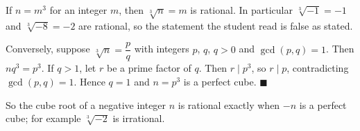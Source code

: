 If $n=m^3$ for an integer $m$, then $\sqrt[3]{n}=m$ is rational. In particular $\sqrt[3]{-1}=-1$ and $\sqrt[3]{-8}=-2$ are rational, so the statement the student read is false as stated.

Conversely, suppose $\sqrt[3]{n}=\dfrac{p}{q}$ with integers $p$, $q$, $q>0$ and $\gcd(p,q)=1$. Then $nq^3=p^3$. If $q>1$, let $r$ be a prime factor of $q$. Then $r\mid p^3$, so $r\mid p$, contradicting $\gcd(p,q)=1$. Hence $q=1$ and $n=p^3$ is a perfect cube. $\blacksquare$

So the cube root of a negative integer $n$ is rational exactly when $-n$ is a perfect cube; for example $\sqrt[3]{-2}$ is irrational.
